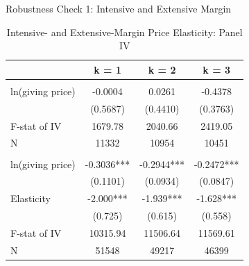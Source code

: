 \documentclass[
  ignorenonframetext,
]{beamer}
\begin{document}
\begin{frame}{Robustness Check 1: Intensive and Extensive Margin}
\protect\hypertarget{robustness-check-1-intensive-and-extensive-margin}{}
\begin{table}

\caption{\label{tab:kablePanelIVEstimateElasticityIntExt}Intensive- and Extensive-Margin Price Elasticity: Panel IV}
\centering
\fontsize{9}{11}\selectfont
\begin{tabular}[t]{lccc}
\toprule
 & k = 1 & k = 2 & k = 3\\
\midrule
\addlinespace[0.3em]
\multicolumn{4}{l}{\textbf{Intensive Margin}}\\
\hspace{1em}ln(giving price) & -0.0004 & 0.0261 & -0.4378\\
\hspace{1em} & (0.5687) & (0.4410) & (0.3763)\\
\hspace{1em}F-stat of IV & 1679.78 & 2040.66 & 2419.05\\
\hspace{1em}N & 11332 & 10954 & 10451\\
\addlinespace[0.3em]
\multicolumn{4}{l}{\textbf{Extensive Margin}}\\
\hspace{1em}ln(giving price) & -0.3036*** & -0.2944*** & -0.2472***\\
\hspace{1em} & (0.1101) & (0.0934) & (0.0847)\\
\hspace{1em}Elasticity & -2.000*** & -1.939*** & -1.628***\\
\hspace{1em} & (0.725) & (0.615) & (0.558)\\
\hspace{1em}F-stat of IV & 10315.94 & 11506.64 & 11569.61\\
\hspace{1em}N & 51548 & 49217 & 46399\\
\bottomrule
\end{tabular}
\end{table}
\end{frame}
\end{document}
